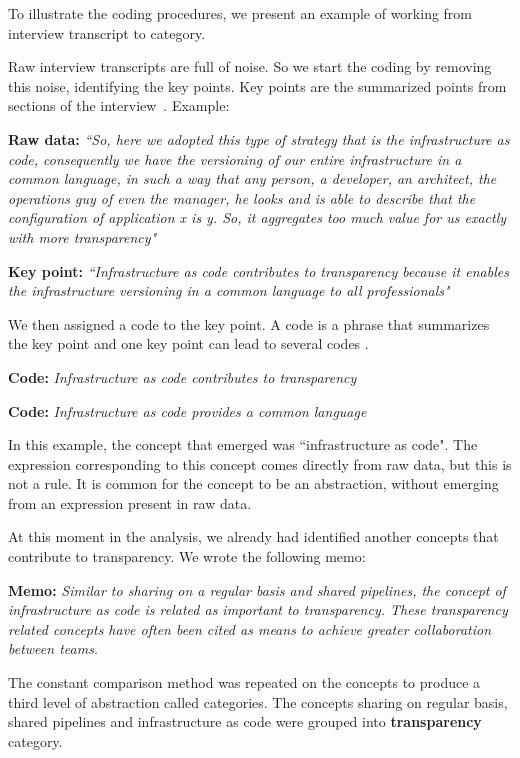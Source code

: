 To illustrate the coding procedures, we present an example of working from
interview transcript to category.

Raw interview transcripts are full of noise. So we start the coding by removing
this noise, identifying the key points. Key points are the summarized points
from sections of the interview~\cite{georgieva2008best}. Example:

\textbf{Raw data:} \textit{``So, here we adopted this type of strategy that is
the infrastructure as code, consequently we have the versioning of our entire
infrastructure in a common language, in such a way that any person, a
developer, an architect, the operations guy of even the manager, he looks and
is able to describe that the configuration of application x is y. So, it
aggregates too much value for us exactly with more transparency"}

\textbf{Key point:} \textit{``Infrastructure as code contributes to
transparency because it enables the infrastructure versioning in a common
language to all professionals"}

We then assigned a code to the key point. A code is a phrase that summarizes
the key point and one key point can lead to several codes
\cite{hoda2017becoming}.

\textbf{Code:} \textit{Infrastructure as code contributes to transparency}

\textbf{Code:} \textit{Infrastructure as code provides a common language}

In this example, the concept that emerged was ``infrastructure as code". The
expression corresponding to this concept comes directly from raw data, but this
is not a rule. It is common for the concept to be an abstraction, without
emerging from an expression present in raw data.

At this moment in the analysis, we already had identified another concepts that
contribute to transparency. We wrote the following memo:

\textbf{Memo:} \textit{Similar to sharing on a regular basis and shared
pipelines, the concept of infrastructure as code is related as important to
transparency. These transparency related concepts have often been cited as
means to achieve greater collaboration between teams}.

The constant comparison method was repeated on the concepts to produce a third
level of abstraction called categories. The concepts sharing on regular basis,
shared pipelines and infrastructure as code were grouped into
\textbf{transparency} category.

